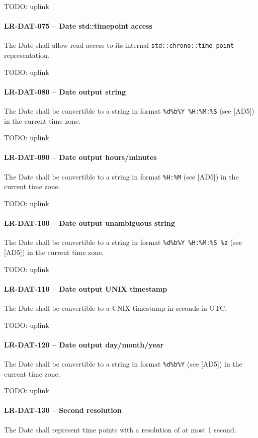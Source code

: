 TODO: uplink

\paragraph{LR-DAT-075 -- Date std::time\textunderscore point access}
The Date shall allow read access to its internal
\lstinline{std::chrono::time_point} representation.

TODO: uplink

\paragraph{LR-DAT-080 -- Date output string}
The Date shall be convertible to a string in format
\lstinline{%d%b%Y %H:%M:%S} (see [AD5]) in the current time zone.

TODO: uplink
\paragraph{LR-DAT-090 -- Date output hours/minutes}
The Date shall be convertible to a string in format
\lstinline{%H:%M} (see [AD5]) in the current time zone.

TODO: uplink
\paragraph{LR-DAT-100 -- Date output unambiguous string}
The Date shall be convertible to a string in format
\lstinline{%d%b%Y %H:%M:%S %z} (see [AD5]) in the current time zone.

TODO: uplink
\paragraph{LR-DAT-110 -- Date output UNIX timestamp}
The Date shall be convertible to a UNIX timestamp in seconds in \gls{UTC}.

TODO: uplink
\paragraph{LR-DAT-120 -- Date output day/month/year}
The Date shall be convertible to a string in format
\lstinline{%d%b%Y} (see [AD5]) in the current time zone.

TODO: uplink
\paragraph{LR-DAT-130 -- Second resolution}
The Date shall represent time points with a resolution of at most 1 second.

